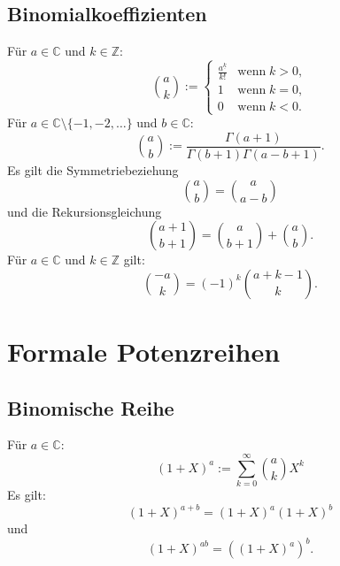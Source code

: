 \subsection{Binomialkoeffizienten}
 Für $a\in\mathbb C$
und $k\in\mathbb Z$:
\begin{equation}
\binom{a}{k} := \begin{cases}
\frac{a^{\underline k}}{k!} & \text{wenn}\;k>0,\\
1 & \text{wenn}\;k=0,\\
0 & \text{wenn}\;k<0.
\end{cases}
\end{equation}
Für $a\in\mathbb C\setminus\{-1,-2,\ldots\}$ und $b\in\mathbb C$:
\begin{equation}\label{eq:bc-allg}
\binom{a}{b} := \frac{\Gamma(a+1)}{\Gamma(b+1)\Gamma(a-b+1)}.
\end{equation}
Es gilt die Symmetriebeziehung
\begin{equation}
\binom{a}{b} = \binom{a}{a-b}
\end{equation}
und die Rekursionsgleichung
\begin{equation}
\binom{a+1}{b+1} = \binom{a}{b+1}+\binom{a}{b}.
\end{equation}
Für $a\in\mathbb C$ und $k\in\mathbb Z$ gilt:
\begin{equation}
\binom{-a}{k} = (-1)^k \binom{a+k-1}{k}.
\end{equation}

\section{Formale Potenzreihen}
\subsection{Binomische Reihe}
 Für $a\in\mathbb C$:
\begin{equation}
(1+X)^a := \sum_{k=0}^\infty \binom{a}{k} X^k
\end{equation}
Es gilt:
\begin{equation}
(1+X)^{a+b} = (1+X)^a (1+X)^b 
\end{equation}
und
\begin{equation}
(1+X)^{ab} = ((1+X)^a)^b.
\end{equation}
